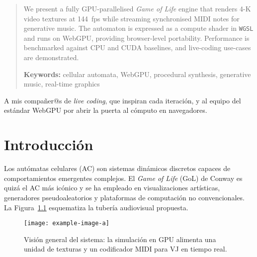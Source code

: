 \documentclass{report}
\begin{document}
\renewcommand{\abstractname}{Abstract}
\begin{abstract}
We present a fully GPU-parallelised \emph{Game of Life} engine that renders
4-K video textures at \SI{144}{fps} while streaming synchronised MIDI notes for
generative music.  The automaton is expressed as a compute shader in
\texttt{WGSL} and runs on WebGPU, providing browser-level portability.
Performance is benchmarked against CPU and CUDA baselines, and live-coding
use-cases are demonstrated.

\medskip
\noindent\textbf{Keywords:} cellular automata, WebGPU, procedural synthesis,
generative music, real-time graphics
\end{abstract}

\begin{umaacknowledgments}
A mis compañer@s de \emph{live coding}, que inspiran cada iteración, y al
equipo del estándar WebGPU por abrir la puerta al cómputo en navegadores.
\end{umaacknowledgments}

\cleardoublepage
\tableofcontents
\cleardoublepage
\listoffigures
\cleardoublepage
\listoftables
\cleardoublepage

\printnomenclature
\cleardoublepage

\mainmatter
\chapter{Introducción}
Los autómatas celulares (AC) son sistemas dinámicos discretos capaces de
comportamientos emergentes complejos.  El \emph{Game of Life} (GoL) de Conway
es quizá el AC más icónico y se ha empleado en visualizaciones artísticas,
generadores pseudoaleatorios y plataformas de computación no convencionales.
La Figura~\cref{fig:overview} esquematiza la tubería audiovisual propuesta.

\begin{figure}[ht]
  \centering
  \texttt{[image: example-image-a]}
  \caption{Visión general del sistema: la simulación en GPU alimenta una unidad
           de texturas y un codificador MIDI para VJ en tiempo real.}
  \label{fig:overview}
\end{figure}
\end{document}
